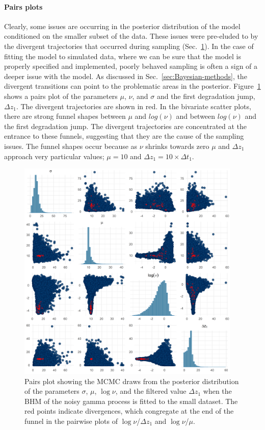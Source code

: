 \paragraph*{Pairs plots}
Clearly, some issues are occurring in the posterior distribution of the model conditioned on the smaller subset of the data. These issues were pre-eluded to by the divergent trajectories that occurred during sampling (Sec.~\ref{fig:pairs}). In the case of fitting the model to simulated data, where we can be sure that the model is properly specified and implemented, poorly behaved sampling is often a sign of a deeper issue with the model. As discussed in Sec.~\ref{sec:Bayesian-methods}, the divergent transitions can point to the problematic areas in the posterior. Figure~\ref{fig:pairs} shows a pairs plot of the parameters $\mu$, $\nu$, and $\sigma$ and the first degradation jump, $\Delta z_1$. The divergent trajectories are shown in red. In the bivariate scatter plots, there are strong funnel shapes between $\mu$ and $log(\nu)$ and between $log(\nu)$ and the first degradation jump. The divergent trajectories are concentrated at the entrance to these funnels, suggesting that they are the cause of the sampling issues. The funnel shapes occur because as $\nu$ shrinks towards zero $\mu$ and $\Delta z_1$ approach very particular values; $\mu = 10$ and $\Delta z_1 = 10 \times \Delta t_1$.

\begin{figure}
  \centering
  \includegraphics[width=0.95\textwidth]{./figures/ch-4/Small-data-pairs.png}
  \caption{Pairs plot showing the MCMC draws from the posterior distribution of the parameters $\sigma$, $\mu$, $\log\nu$, and the filtered value $\Delta z_1$ when the BHM of the noisy gamma process is fitted to the small dataset. The red points indicate divergences, which congregate at the end of the funnel in the pairwise plots of $\log\nu$/$\Delta z_1$ and $\log\nu$/$\mu$.}
  \label{fig:pairs}
\end{figure}

